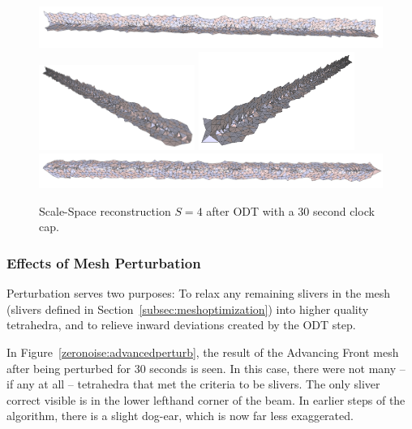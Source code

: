 \documentclass[12pt]{drexelthesis}
\let\Oldsubsubsection\subsubsection
\renewcommand{\subsubsection}{\FloatBarrier\Oldsubsubsection}
\begin{document}
\begin{figure}[!ht]
	\centering
		\includegraphics[width=5in]{simulated-lab-scan/0noise/optimizedNeat/scalespace4odt00.png}
		\includegraphics[width=2in]{simulated-lab-scan/0noise/optimizedNeat/scalespace4odt01.png}
		\includegraphics[width=2in]{simulated-lab-scan/0noise/optimizedNeat/scalespace4odt02.png}
		\includegraphics[width=5in]{simulated-lab-scan/0noise/optimizedNeat/scalespace4odt03.png}
		\caption[Scale-Space reconstruction $S = 4$ after ODT with a 30 second clock cap]{\centering Scale-Space reconstruction $S = 4$ after ODT with a 30 second clock cap.}
	\label{zeronoise:scalespace4odt}
\end{figure}

\subsubsection{Effects of Mesh Perturbation}

Perturbation serves two purposes: To relax any remaining slivers in the mesh (slivers defined in Section~\ref{subsec:meshoptimization}) into higher quality tetrahedra, and to relieve inward deviations created by the ODT step.

In Figure~\ref{zeronoise:advancedperturb}, the result of the Advancing Front mesh after being perturbed for 30 seconds is seen. In this case, there were not many -- if any at all -- tetrahedra that met the criteria to be slivers. The only sliver correct visible is in the lower lefthand corner of the beam. In earlier steps of the algorithm, there is a slight dog-ear, which is now far less exaggerated.
\end{document}
